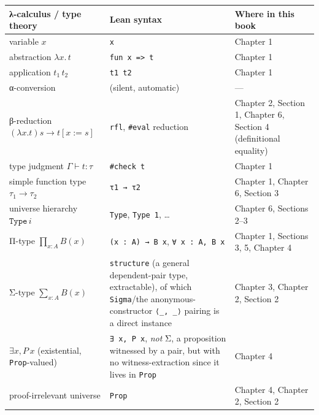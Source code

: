 \begin{longtable}[]{@{}
  >{\raggedright\arraybackslash}p{}
  >{\raggedright\arraybackslash}p{}
  >{\raggedright\arraybackslash}p{}@{}}
\toprule\noalign{}
\begin{minipage}[b]{\linewidth}\raggedright
λ-calculus / type theory
\end{minipage} & \begin{minipage}[b]{\linewidth}\raggedright
Lean syntax
\end{minipage} & \begin{minipage}[b]{\linewidth}\raggedright
Where in this book
\end{minipage} \\
\midrule\noalign{}
\endhead
\bottomrule\noalign{}
\endlastfoot
variable \(x\) & \texttt{x} & Chapter 1 \\
abstraction \(\lambda x.\, t\) & \texttt{fun x => t} & Chapter 1 \\
application \(t_1\, t_2\) & \texttt{t1 t2} & Chapter 1 \\
α-conversion & (silent, automatic) & --- \\
β-reduction \((\lambda x.t)s \to t[x:=s]\) & \texttt{rfl}, \texttt{\#eval} reduction & Chapter 2, Section 1, Chapter 6, Section 4 (definitional equality) \\
type judgment \(\Gamma \vdash t : \tau\) & \texttt{\#check t} & Chapter 1 \\
simple function type \(\tau_1 \to \tau_2\) & \texttt{τ1 → τ2} & Chapter 1, Chapter 6, Section 3 \\
universe hierarchy \(\mathtt{Type}\,i\) & \texttt{Type}, \texttt{Type 1}, \ldots{} & Chapter 6, Sections 2--3 \\
Π-type \(\prod_{x:A} B(x)\) & \texttt{(x : A) → B x}, \texttt{∀ x : A, B x} & Chapter 1, Sections 3, 5, Chapter 4 \\
Σ-type \(\sum_{x:A} B(x)\) & \texttt{structure} (a general dependent-pair type, extractable), of which \texttt{Sigma}/the anonymous-constructor \texttt{⟨\_\allowbreak{}, \_\allowbreak{}⟩} pairing is a direct instance & Chapter 3, Chapter 2, Section 2 \\
\(\exists x, P\, x\) (existential, \texttt{Prop}-valued) & \texttt{∃ x, P x}, \emph{not} Σ, a proposition witnessed by a pair, but with no witness-extraction since it lives in \texttt{Prop} & Chapter 4 \\
proof-irrelevant universe & \texttt{Prop} & Chapter 4, Chapter 2, Section 2 \\

\end{longtable}
